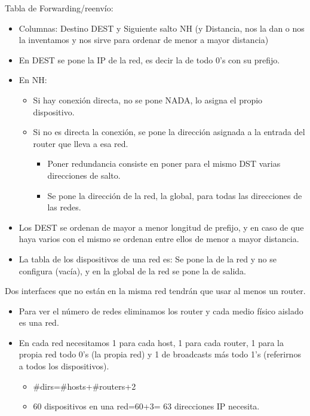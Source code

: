 \documentclass[12pt, twoside, openright]{report} %
\begin{document}
Tabla de Forwarding/reenvío:

\begin{itemize}
	\item Columnas: Destino DEST y Siguiente salto NH (y Distancia, nos la
	      dan o nos la inventamos y nos sirve para ordenar de menor a mayor
	      distancia)
	\item En DEST se pone la IP de la red, es decir la de todo 0's con su
	      prefijo.
	\item En NH:

	      \begin{itemize}
		      \item Si hay conexión directa, no se pone NADA, lo asigna el propio
		            dispositivo.
		      \item Si no es directa la conexión, se pone la dirección asignada a la
		            entrada del router que lleva a esa red.

		            \begin{itemize}
			            \item Poner redundancia consiste en poner para el mismo DST varias
			                  direcciones de salto.
			            \item Se pone la dirección de la red, la global, para todas las
			                  direcciones de las redes.
		            \end{itemize}
	      \end{itemize}
	\item Los DEST se ordenan de mayor a menor longitud de prefijo, y en
	      caso de que haya varios con el mismo se ordenan entre ellos de
	      menor a mayor distancia.
	\item La tabla de los dispositivos de una red es: Se pone la de la red y
	      no se configura (vacía), y en la global de la red se pone la de
	      salida.
\end{itemize}

Dos interfaces que no están en la misma red tendrán que usar al
menos un router.

\begin{itemize}
	\item Para ver el número de redes eliminamos los router y cada medio
	      físico aislado es una red.
	\item En cada red necesitamos 1 para cada host, 1 para cada router, 1
	      para la propia red todo 0's (la propia red) y 1 de broadcasts más
	      todo 1's (referirnos a todos los dispositivos).

	      \begin{itemize}
		      \item \#dirs=\#hosts+\#routers+2
		      \item 60 dispositivos en una red=60+3= 63 direcciones IP necesita.
	      \end{itemize}
\end{itemize}
\end{document}

